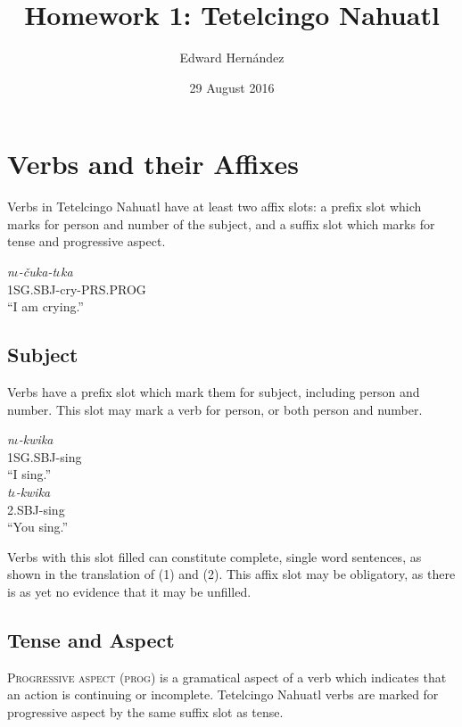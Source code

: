 \documentclass[doc,12pt]{apa6}
\begin{document}
\title{Homework 1: Tetelcingo Nahuatl}
\author{Edward Hern\'{a}ndez}
\date{29 August 2016}
\maketitle

\setcounter{secnumdepth}{3}

\section{Verbs and their Affixes}

Verbs in Tetelcingo Nahuatl have at least two affix slots: a prefix slot which
marks for person and number of the subject, and a suffix slot which marks for
tense and progressive aspect.

\begin{exe}
	\ex \textit{n$\iota$-\v{c}uka-t$\iota$ka} \\
	1SG.SBJ-cry-PRS.PROG \\
	``I am crying.''
\end{exe}

\subsection{Subject}

Verbs have a prefix slot which mark them for subject, including person and
number. This slot may mark a verb for person, or both person and
number.

\begin{exe}
	\ex \textit{n$\iota$-kwika} \\
		1SG.SBJ-sing \\
		``I sing.'' \\
	\ex \textit{t$\iota$-kwika} \\
		2.SBJ-sing \\
		``You sing.''
\end{exe}

Verbs with this slot filled can constitute complete, single word sentences, as
shown in the translation of (1) and (2). This affix slot may be obligatory, as
there is as yet no evidence that it may be unfilled.

\subsection{Tense and Aspect}

\textsc{Progressive aspect} (\textsc{prog}) is a gramatical aspect of a verb which
indicates that an action is continuing or incomplete. Tetelcingo Nahuatl verbs
are marked for progressive aspect by the same suffix slot as tense.
\end{document}
